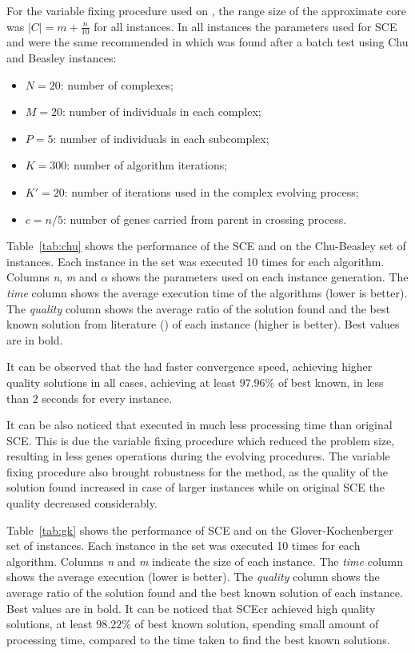 For the variable fixing procedure used on \scecore, the range size of the approximate core was
$|C| = m+\frac{n}{10}$ for all instances.
In all instances the parameters used for SCE and \scecore were the same recommended
in \cite{baroni2015shuffled} which was found after a batch test using Chu and Beasley instances:
\begin{itemize}
  \item $N = 20$: number of complexes;
  \item $M = 20$: number of individuals in each complex;
  \item $P = 5$: number of individuals in each subcomplex;
  \item $K = 300$: number of algorithm iterations;
  \item $K' = 20$: number of iterations used in the complex evolving process;
  \item $c = n/5$: number of genes carried from parent in crossing process.
\end{itemize}

Table~\ref{tab:chu} shows the performance of the SCE and \scecore on the Chu-Beasley set of instances.
Each instance in the set was executed 10 times for each algorithm.
Columns \textit{n}, \textit{m} and \textit{$\alpha$} shows the parameters used
on each instance generation.
The \textit{time} column shows the average execution time of the algorithms (lower is better).
The \textit{quality} column shows the average ratio of the solution found and
the best known solution from literature (\cite{vimont2008reduced, della2012improved}) of each instance (higher is better).
Best values are in bold.

It can be observed that the \scecore had faster convergence speed, achieving higher
quality solutions in all cases, achieving at least $97.96\%$ of best known, in less than $2$ seconds
for every instance.

It can be also noticed that \scecore executed in much less processing time than original
SCE.
This is due the variable fixing procedure which reduced the problem size,
resulting in less genes operations during the evolving procedures.
The variable fixing procedure also brought robustness for the method, as the quality
of the solution found increased in case of larger instances while on original
SCE the quality decreased considerably.

Table~\ref{tab:gk} shows the performance of SCE and \scecore on the Glover-Kochenberger set of instances.
Each instance in the set was executed 10 times for each algorithm.
Columns \textit{n} and \textit{m} indicate the size of each instance.
The \textit{time} column shows the average execution (lower is better).
The \textit{quality} column shows the average ratio of the solution found and
the best known solution of each instance.
Best values are in bold.
It can be noticed that SCEcr achieved high quality solutions, at least $98.22\%$
of best known solution, spending small amount of processing time, compared
to the time taken to find the best known solutions.


